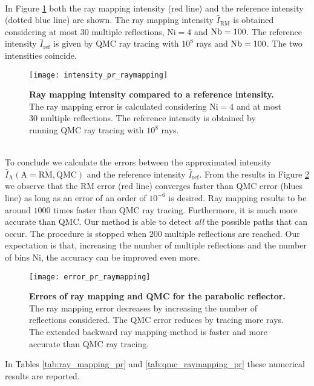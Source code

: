 \\ \indent In Figure \ref{fig:intensity_pr_raymapping} both the ray mapping intensity (red line) and the reference intensity (dotted blue line) are shown. The ray mapping intensity $\hat{I}_{\textrm{RM}}$ is obtained considering at most $30$ multiple reflections, $\textrm{Ni}=4$ and $\textrm{Nb} = 100$. The reference intensity $\hat{I}_{\textrm{ref}}$ is given by QMC ray tracing with $10^8$ rays and $\textrm{Nb} = 100$. The two intensities coincide.
\begin{figure}[t]
  \begin{center}
  \texttt{[image: intensity\_pr\_raymapping]}
  \end{center}
  \caption{\textbf{Ray mapping intensity compared to a reference intensity.}
The ray mapping error is calculated considering $\textrm{Ni}=4$ and at most $30$ multiple reflections. The reference intensity is obtained by running QMC ray tracing with $10^8$ rays.}
\label{fig:intensity_pr_raymapping}
 \end{figure}
\\ \indent
To conclude we calculate the errors between the approximated intensity $\hat{I}_{\textrm{A}} (\textrm{A}=\textrm{RM}, \textrm{QMC})$ and the reference intensity $\hat{I}_{\textrm{ref}}$. From the results in Figure \ref{fig:error_raymapping_pr} we observe that the RM error (red line) converges faster than QMC error (blues line) as long as an error of an order of $10^{-6}$ is desired. Ray mapping results to be around $1000$ times faster than QMC ray tracing. Furthermore, it is much more accurate than QMC. Our method is able to detect \textit{all} the possible paths that can occur. The procedure is stopped when $200$ multiple reflections are reached. Our expectation is that, increasing the number of multiple reflections and the number of bins $\textrm{Ni}$, the accuracy can be improved even more.
\begin{figure}[h]
  \begin{center}
  \texttt{[image: error\_pr\_raymapping]}
  \end{center}
  \caption{\textbf{Errors of ray mapping and QMC for the parabolic reflector.}
The ray mapping error decreases by increasing the number of reflections considered.
The QMC error reduces by tracing more rays.
 The extended backward ray mapping method is faster and more accurate than QMC ray tracing.}
\label{fig:error_raymapping_pr}
 \end{figure}
In Tables \ref{tab:ray_mapping_pr} and \ref{tab:qmc_raymapping_pr} these numerical results are reported.
